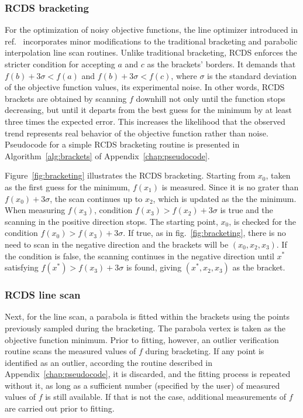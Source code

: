\subsubsection{RCDS bracketing}
For the optimization of noisy objective functions, the line optimizer introduced in ref.~\cite{huang_algorithm_2013} incorporates minor modifications to the traditional bracketing and parabolic interpolation line scan routines. Unlike traditional bracketing, RCDS enforces the stricter condition for accepting $a$ and $c$ as the brackets' borders. It demands that $f(b) + 3\sigma < f(a)$ and $f(b) + 3\sigma < f(c)$, where $\sigma$ is the standard deviation of the objective function values, its experimental noise. In other words, RCDS brackets are obtained by scanning $f$ downhill not only until the function stops decreasing, but until it departs from the best guess for the minimum by at least three times the expected error. This increases the likelihood that the observed trend represents real behavior of the objective function rather than noise. Pseudocode for a simple RCDS bracketing routine is presented in Algorithm~\ref{alg:brackets} of Appendix~\ref{chap:pseudocode}.

Figure~\ref{fig:bracketing} illustrates the RCDS bracketing. Starting from $x_0$, taken as the first guess for the minimum, $f(x_1)$ is measured. Since it is no grater than $f(x_0)+3\sigma$, the scan continues up to $x_2$, which is updated as the the minimum. When measuring $f(x_3)$, condition $f(x_3) > f(x_2) + 3\sigma$ is true and the scanning in the positive direction stops. The starting point, $x_0$, is checked for the condition $f(x_0)>f(x_3)+3\sigma$. If true, as in fig.~\ref{fig:bracketing}, there is no need to scan in the negative direction and the brackets will be $(x_0, x_2, x_3)$. If the condition is false, the scanning continues in the negative direction until $x^*$ satisfying $f(x^*)>f(x_3)+3\sigma$ is found, giving $(x^*, x_2, x_3)$ as the bracket.

\subsubsection{RCDS line scan}
Next, for the line scan, a parabola is fitted within the brackets using the points previously sampled during the bracketing. The parabola vertex is taken as the objective function minimum. Prior to fitting, however, an outlier verification routine scans the measured values of $f$ during bracketing. If any point is identified as an outlier, according the routine described in Appendix~\ref{chap:pseudocode}, it is discarded, and the fitting process is repeated without it, as long as a sufficient number (specified by the user) of measured values of $f$ is still available. If that is not the case, additional measurements of $f$ are carried out prior to fitting.

